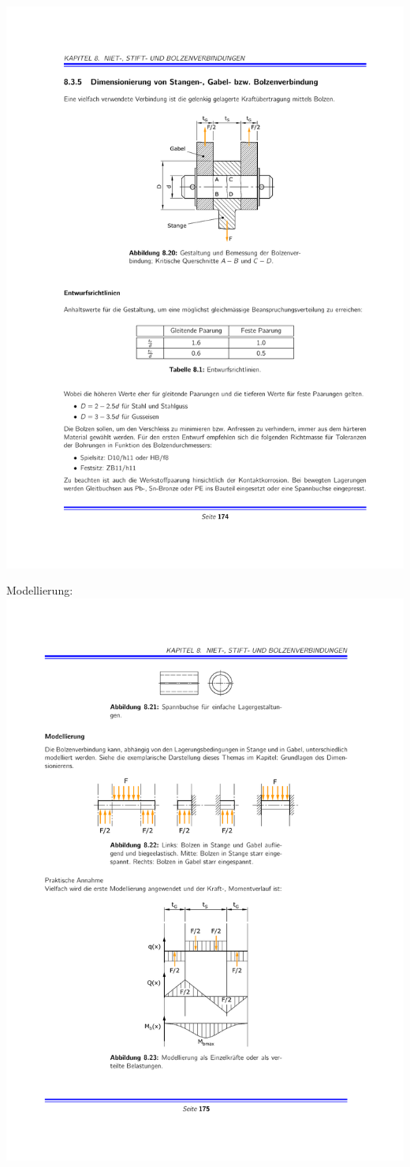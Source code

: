		\begin{center}
			\includegraphics[width=.65\columnwidth]{graphics/stangegabelbolzen}
		\end{center}
		Modellierung: \\
		\includegraphics[width=\columnwidth]{graphics/stangegabelbolzen2}
